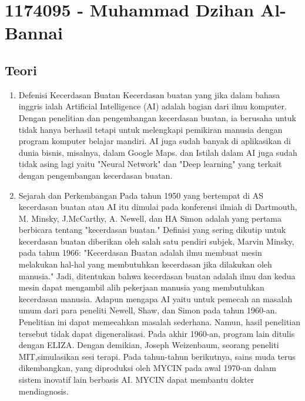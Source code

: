\section{1174095 - Muhammad Dzihan Al-Bannai}
\subsection{Teori}
\begin{enumerate}

	\item Defenisi Kecerdasan Buatan
	\hfill\break
	Kecerdasan buatan yang jika dalam bahasa inggris ialah Artificial Intelligence (AI) adalah bagian dari ilmu komputer. Dengan penelitian dan pengembangan kecerdasan buatan, ia berusaha untuk tidak hanya berhasil tetapi untuk melengkapi pemikiran manusia dengan program komputer belajar mandiri. AI juga sudah banyak di aplikasikan di dunia bisnis, misalnya, dalam Google Maps. dan Istilah dalam AI juga sudah tidak asing lagi yaitu "Neural Network" dan "Deep learning" yang terkait dengan pengembangan kecerdasan buatan.



	\item Sejarah dan Perkembangan
	\hfill\break
	Pada tahun 1950 yang bertempat di AS kecerdasan buatan atau AI itu dimulai pada konferensi ilmiah di Dartmouth, M. Minsky, J.McCarthy, A. Newell, dan HA Simon adalah yang pertama berbicara tentang "kecerdasan buatan." Definisi yang sering dikutip untuk kecerdasan buatan diberikan oleh salah satu pendiri subjek, Marvin Minsky, pada tahun 1966: "Kecerdasan Buatan adalah ilmu membuat mesin melakukan hal-hal yang membutuhkan kecerdasan jika dilakukan oleh manusia." Jadi, ditentukan bahwa kecerdasan buatan adalah ilmu dan kedua mesin dapat mengambil alih pekerjaan manusia yang membutuhkan kecerdasan manusia. Adapun mengapa AI yaitu untuk pemecah an masalah umum dari para peneliti Newell, Shaw, dan Simon pada tahun 1960-an. Penelitian ini dapat memecahkan masalah sederhana. Namun, hasil penelitian tersebut tidak dapat digeneralisasi. Pada akhir 1960-an, program lain ditulis dengan ELIZA. Dengan demikian, Joseph Weizenbaum, seorang peneliti MIT,simulasikan sesi terapi. Pada tahun-tahun berikutnya, sains muda terus dikembangkan, yang diproduksi oleh MYCIN pada awal 1970-an dalam sistem inovatif lain berbasis AI. MYCIN dapat membantu dokter mendiagnosis.
	


\end{enumerate}
